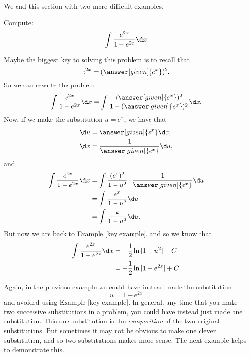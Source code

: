 \documentclass{ximera}
\begin{document}
We end this section with two more difficult examples.



\begin{example}
Compute:
\[
\int \frac{e^{2x}}{1 - e^{2x}} \d x
\]
\begin{explanation}
Maybe the biggest key to solving this problem is to recall that
\[
e^{2x} = (\answer[given]{e^x})^2.
\]
So we can rewrite the problem
\[
\int \frac{e^{2x}}{1 - e^{2x}} \d x = \int \frac{(\answer[given]{e^x})^2}{1 - (\answer[given]{e^x})^2} \d x.
\]
Now, if we make the substitution $u = e^x$, we have that
\begin{align*}
\d u &= \answer[given]{e^x} \d x,\\
\d x &= \frac{1}{\answer[given]{e^x}} \d u,
\end{align*}
and
\begin{align*}
\int \frac{e^{2x}}{1 - e^{2x}} \d x &= \int \frac{(e^x)^2}{1 - u^2} \cdot \frac{1}{\answer[given]{e^x}} \d u  \\
&= \int \frac{e^x}{1-u^2} \d u  \\
&= \int \frac{u}{1-u^2} \d u.
\end{align*}
But now we are back to Example \ref{key example}, and so we know that
\begin{align*}
\int \frac{e^{2x}}{1 - e^{2x}} \d x &= - \frac{1}{2} \ln|1-u^2| + C  \\
&= - \frac{1}{2} \ln|1 - e^{2x}| + C.
\end{align*}
\end{explanation}
\end{example}


Again, in the previous example we could have instead made the substitution 
\[
u = 1 - e^{2x}
\]
and avoided using Example \ref{key example}.  
In general, any time that you make two successive substitutions in a problem, you could have instead just made one substitution.  
This one substitution is the \textit{composition} of the two original substitutions.  
But sometimes it may not be obvious to make one clever substitution, and so two substitutions makes more sense.  
The next example helps to demonstrate this.
\end{document}
